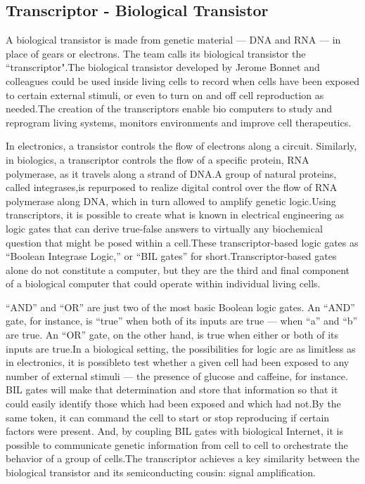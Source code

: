 \documentclass[a4paper]{article}
\begin{document}
\subsection{Transcriptor - Biological Transistor}

A biological transistor is made from genetic material — DNA and RNA — in place of gears or electrons. The team calls its biological transistor the “transcriptor".The biological transistor developed by Jerome Bonnet and colleagues could be used inside living cells to record when cells have been exposed to certain external stimuli, or even to turn on and off cell reproduction as needed.The creation of the transcriptors enable bio computers to study and reprogram living systems, monitors environments and improve cell therapeutics.

In electronics, a transistor controls the flow of electrons along a circuit. Similarly, in biologics, a transcriptor controls the flow of a specific protein, RNA polymerase, as it travels along a strand of DNA.A group of natural proteins, called integrases,is repurposed to realize digital control over the flow of RNA polymerase along DNA, which in turn allowed to amplify genetic logic.Using transcriptors, it is possible to create what is known in electrical engineering as logic gates that can derive true-false answers to virtually any biochemical question that might be posed within a cell.These transcriptor-based logic gates as “Boolean Integrase Logic,” or “BIL gates” for short.Transcriptor-based gates alone do not constitute a computer, but they are the third and final component of a biological computer that could operate within individual living cells.

“AND” and “OR” are just two of the most basic Boolean logic gates. An “AND” gate, for instance, is “true” when both of its inputs are true — when “a” and “b” are true. An “OR” gate, on the other hand, is true when either or both of its inputs are true.In a biological setting, the possibilities for logic are as limitless as in electronics, it is possibleto test whether a given cell had been exposed to any number of external stimuli — the presence of glucose and caffeine, for instance. BIL gates will make that determination and  store that information so that it could easily identify those which had been exposed and which had not.By the same token, it  can command the cell to start or stop reproducing if certain factors were present. And, by coupling BIL gates with biological Internet, it is possible to communicate genetic information from cell to cell to orchestrate the behavior of a group of cells.The transcriptor achieves a key similarity between the biological transistor and its semiconducting cousin: signal amplification.
\end{document}

